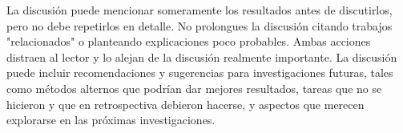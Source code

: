 La discusión puede mencionar someramente los resultados antes de discutirlos, pero no debe repetirlos en detalle. No prolongues la discusión citando trabajos "relacionados" o planteando explicaciones poco probables. Ambas acciones distraen al lector y lo alejan de la discusión realmente importante. La discusión puede incluir recomendaciones y sugerencias para investigaciones futuras, tales como métodos alternos que podrían dar mejores resultados, tareas que no se hicieron y que en retrospectiva debieron hacerse, y aspectos que merecen explorarse en las próximas investigaciones. 
